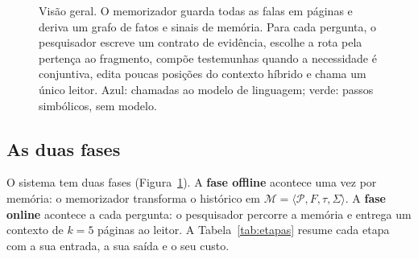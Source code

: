 \documentclass[11pt]{article}
\begin{document}
\begin{figure}[t]
{}
\caption{Visão geral. O memorizador guarda todas as falas em páginas e deriva
um grafo de fatos e sinais de memória. Para cada pergunta, o pesquisador
escreve um contrato de evidência, escolhe a rota pela pertença ao fragmento,
compõe testemunhas quando a necessidade é conjuntiva, edita poucas posições do
contexto híbrido e chama um único leitor. Azul: chamadas ao modelo de
linguagem; verde: passos simbólicos, sem modelo.}
\label{fig:visao}
\end{figure}

\subsection{As duas fases}

O sistema tem duas fases (Figura~\ref{fig:visao}). A \textbf{fase offline}
acontece uma vez por memória: o memorizador transforma o histórico em
$\mathcal{M}=\langle\mathcal{P},F,\tau,\Sigma\rangle$. A \textbf{fase online}
acontece a cada pergunta: o pesquisador percorre a memória e entrega um
contexto de $k=5$ páginas ao leitor. A Tabela~\ref{tab:etapas} resume cada
etapa com a sua entrada, a sua saída e o seu custo.
\end{document}
